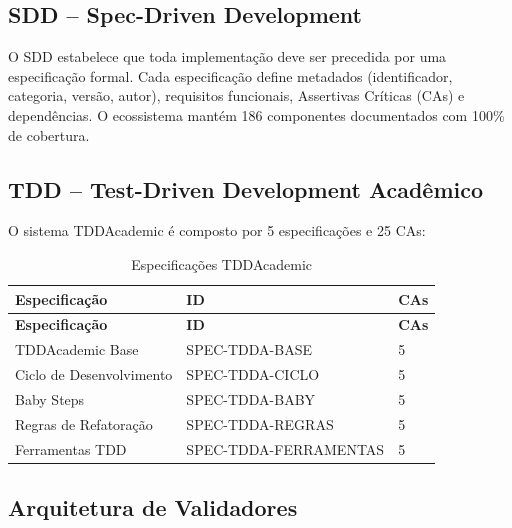\documentclass[
  brazil,
  sumario=tradicional,
  10pt
]{abntex2}
\begin{document}
\subsection{SDD -- Spec-Driven Development}

O SDD estabelece que toda implementação deve ser precedida por uma
especificação formal. Cada especificação define metadados
(identificador, categoria, versão, autor), requisitos funcionais,
Assertivas Críticas (CAs) e dependências. O ecossistema mantém 186
componentes documentados com 100\% de cobertura.

\subsection{TDD -- Test-Driven Development Acadêmico}

O sistema TDDAcademic é composto por 5 especificações e 25 CAs:

\begin{longtable}{p{4cm}p{3cm}p{5cm}}
  \caption{Especificações TDDAcademic}
  \label{tab:tdd}\\
  \toprule
  \textbf{Especificação} & \textbf{ID} & \textbf{CAs} \\
  \midrule
  \endfirsthead
  \toprule
  \textbf{Especificação} & \textbf{ID} & \textbf{CAs} \\
  \midrule
  \endhead
  \bottomrule
  \endfoot
  TDDAcademic Base       & SPEC-TDDA-BASE      & 5 \\
  Ciclo de Desenvolvimento & SPEC-TDDA-CICLO   & 5 \\
  Baby Steps             & SPEC-TDDA-BABY      & 5 \\
  Regras de Refatoração  & SPEC-TDDA-REGRAS    & 5 \\
  Ferramentas TDD        & SPEC-TDDA-FERRAMENTAS & 5 \\
\end{longtable}

\subsection{Arquitetura de Validadores}
\end{document}
